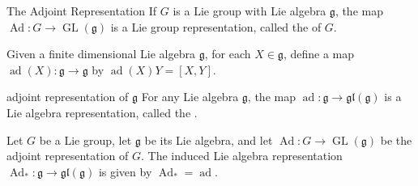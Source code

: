 \documentclass[../main.tex]{subfiles}
\begin{document}
\begin{proposition}{The Adjoint Representation}{}
If \(G\) is a Lie group with Lie algebra \(\mathfrak{g}\), the map \(\operatorname{Ad}\colon G \to \operatorname{GL}(\mathfrak{g})\) is a Lie group representation, called the  of \(G\).
\end{proposition}

\begin{definition}{}{}
    Given a finite dimensional Lie algebra $\mathfrak{g}$, for each $X \in \mathfrak{g}$, define a map $\operatorname{ad}(X):\mathfrak{g} \to \mathfrak{g}$ by $\operatorname{ad}(X)Y=[X,Y]$.
\end{definition}
\begin{proposition}{adjoint representation of $\mathfrak{g}$}{}
For any Lie algebra $\mathfrak{g}$, the map $\operatorname{ad}:\mathfrak{g} \to \mathfrak{gl}(\mathfrak{g})$ is a Lie algebra representation, called the .
\end{proposition}
\begin{theorem}{}{}
Let $G$ be a Lie group, let $\mathfrak{g}$ be its Lie algebra, and let $\operatorname{Ad}\colon G \to \operatorname{GL}(\mathfrak{g})$ be the adjoint representation of $G$. The induced Lie algebra representation $\operatorname{Ad}_{*}\colon \mathfrak{g} \to \mathfrak{gl}(\mathfrak{g})$ is given by $\operatorname{Ad}_{*} = \operatorname{ad}$.
\end{theorem}
\end{document}
